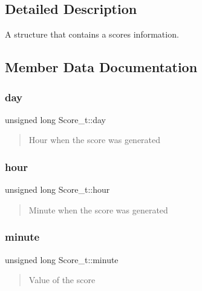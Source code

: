 \subsection{Detailed Description}
A structure that contains a score\textquotesingle{}s information. 

\subsection{Member Data Documentation}
\hypertarget{struct_score__t_a26a15e675c59db516e0a7dbdda35fe66}{}\label{struct_score__t_a26a15e675c59db516e0a7dbdda35fe66} 
\subsubsection{\texorpdfstring{day}{day}}
{\footnotesize\ttfamily unsigned long Score\+\_\+t\+::day}



\begin{quote}
Hour when the score was generated \end{quote}


\hypertarget{struct_score__t_a787052856b8f467eae6b2fa0f39dc508}{}\label{struct_score__t_a787052856b8f467eae6b2fa0f39dc508} 
\subsubsection{\texorpdfstring{hour}{hour}}
{\footnotesize\ttfamily unsigned long Score\+\_\+t\+::hour}



\begin{quote}
Minute when the score was generated \end{quote}


\hypertarget{struct_score__t_a035bb47e5cdd035b8040c0c14c02547c}{}\label{struct_score__t_a035bb47e5cdd035b8040c0c14c02547c} 
\subsubsection{\texorpdfstring{minute}{minute}}
{\footnotesize\ttfamily unsigned long Score\+\_\+t\+::minute}



\begin{quote}
Value of the score \end{quote}


